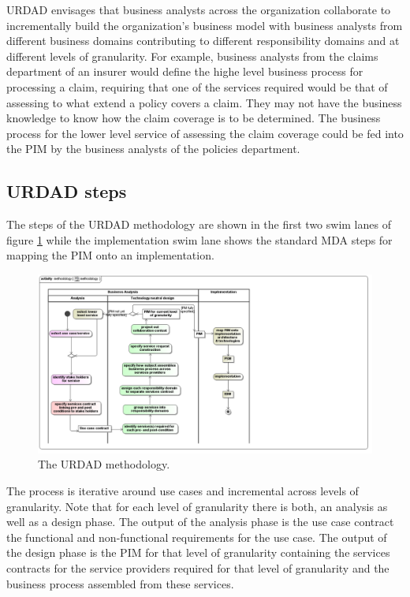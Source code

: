\documentclass{llncs}
\begin{document}
URDAD envisages that business analysts across the organization collaborate to incrementally build the organization's business model with business analysts from different business domains contributing to different responsibility domains and at different levels of granularity.
For example, business analysts from the claims department of an insurer would define the highe level business process for processing a claim, requiring that one of the services required would be that of assessing to what extend a policy covers a claim. They may not have the business knowledge to know how the claim coverage is to be determined. The business process for the lower level service of assessing the claim coverage could be fed into the PIM by the business analysts of the policies department.


\subsection{URDAD steps}

The steps of the URDAD methodology are shown in the first two swim lanes of
figure \ref{fig:methodology} while the implementation swim lane shows the
standard MDA steps for mapping the PIM onto an implementation. 

\begin{figure}[h]
	\begin{center}
		\includegraphics[width=\textwidth]{methodology}
		\caption{The URDAD methodology.}
		\label{fig:methodology}
	\end{center}
\end{figure}

The process is iterative around use cases and incremental across levels of
granularity. Note that for each level of granularity there is both, an analysis
as well as a design phase. The output of the analysis phase is the use
case contract the functional and non-functional requirements for the use
case. The output of the design phase is the PIM for that level of
granularity containing the services contracts for the service providers
required for that level of granularity and the business process assembled
from these services.
\end{document}
